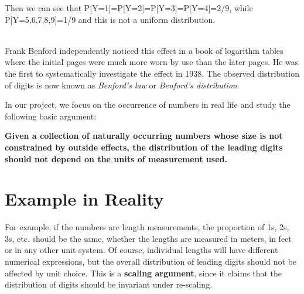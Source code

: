 \documentclass[12pt]{article}
\begin{document}
Then we can see that P[Y=1]=P[Y=2]=P[Y=3]=P[Y=4]=2/9, while P[Y=5,6,7,8,9]=1/9 and this is not a uniform distribution.
\\\
\par Frank Benford independently noticed this effect in a book of logarithm tables where the
initial pages were much more worn by use than the later pages. He was the first to systematically investigate the
effect in 1938. The observed distribution of digits is now known as \emph{Benford’s law} or \emph{Benford’s distribution}. 
\par In our project, we focus on the occurrence of numbers in real life and study the following basic argument:
\par \textbf{Given a collection of naturally occurring numbers whose size is not constrained by outside effects,
the distribution of the leading digits should not depend on the units of measurement used.}
\section{Example in Reality}
\par For example, if the numbers are length measurements, the proportion of 1s, 2s, 3s, etc. should be the same,
whether the lengths are measured in meters, in feet or in any other unit system. Of course, individual lengths
will have different numerical expressions, but the overall distribution of leading digits should not be affected by
unit choice. This is a \textbf{scaling argument}, since it claims that the distribution of digits should be invariant under
re-scaling.
\end{document}
